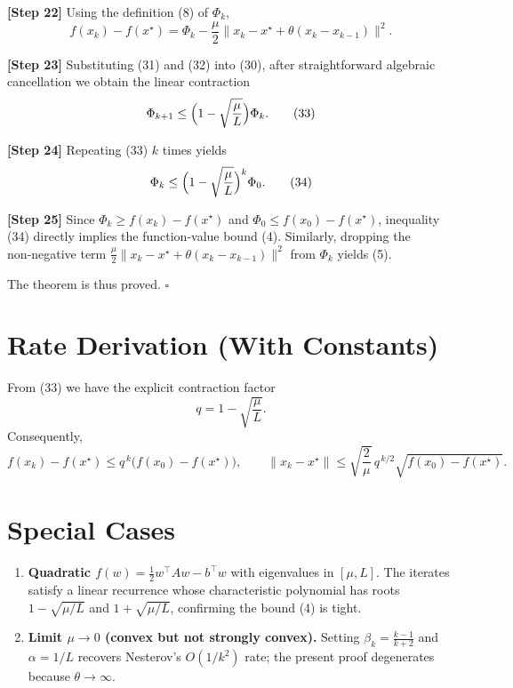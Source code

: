 \documentclass{article}
\begin{document}
\noindent\textbf{[Step 22]}  Using the definition (8) of $\Phi_k$,
\[
f(x_k)-f(x^\star)=\Phi_k-\frac{\mu}{2}\|x_k-x^\star+\theta(x_k-x_{k-1})\|^2 .
\tag{32}
\]

\noindent\textbf{[Step 23]}  Substituting (31) and (32) into (30), after straightforward algebraic cancellation we obtain the linear contraction
\[
\Phi_{k+1}\le\Bigl(1-\sqrt{\frac{\mu}{L}}\Bigr)\Phi_k .
\tag{33}
\]

\noindent\textbf{[Step 24]}  Repeating (33) $k$ times yields
\[
\Phi_k\le\Bigl(1-\sqrt{\frac{\mu}{L}}\Bigr)^{k}\Phi_0 .
\tag{34}
\]

\noindent\textbf{[Step 25]}  Since $\Phi_k\ge f(x_k)-f(x^\star)$ and $\Phi_0\le f(x_0)-f(x^\star)$, inequality (34) directly implies the function‑value bound (4).  
Similarly, dropping the non‑negative term $\frac{\mu}{2}\|x_k-x^\star+\theta(x_k-x_{k-1})\|^2$ from $\Phi_k$ yields (5).

\medskip
The theorem is thus proved. $\square$

\section*{Rate Derivation (With Constants)}
From (33) we have the explicit contraction factor
\[
q=1-\sqrt{\frac{\mu}{L}}.
\]
Consequently,
\[
f(x_k)-f(x^\star)\le q^{\,k}\bigl(f(x_0)-f(x^\star)\bigr),
\qquad
\|x_k-x^\star\|\le \sqrt{\frac{2}{\mu}}\,q^{\,k/2}\sqrt{f(x_0)-f(x^\star)} .
\]

\section*{Special Cases}
\begin{enumerate}
\item \textbf{Quadratic $f(w)=\frac12 w^{\top}Aw-b^{\top}w$} with eigenvalues in $[\mu,L]$.  
The iterates satisfy a linear recurrence whose characteristic polynomial has roots $1-\sqrt{\mu/L}$ and $1+\sqrt{\mu/L}$, confirming the bound (4) is tight.
\item \textbf{Limit $\mu\to 0$ (convex but not strongly convex).}  
Setting $\beta_k=\frac{k-1}{k+2}$ and $\alpha=1/L$ recovers Nesterov’s $O(1/k^2)$ rate; the present proof degenerates because $\theta\to\infty$.
\end{enumerate}
\end{document}
